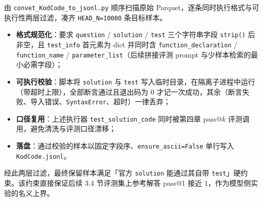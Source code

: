 
由 \texttt{convet\_KodCode\_to\_jsonl.py} 顺序扫描原始 Parquet，逐条同时执行格式与可执行性两层过滤，凑齐 \texttt{HEAD\_N=10000} 条目标样本。

\begin{itemize}
    \item \textbf{格式规范化}：要求 \texttt{question} / \texttt{solution} / \texttt{test} 三个字符串字段 \texttt{strip()} 后非空，且 \texttt{test\_info} 首元素为 dict 并同时含 \texttt{function\_declaration} / \texttt{function\_name} / \texttt{parameter\_list}（后续拼接评测 prompt 与少样本检索的最小必需字段）；
    \item \textbf{可执行校验}：脚本将 \texttt{solution} 与 \texttt{test} 写入临时目录，在隔离子进程中运行（带超时上限），全部断言通过且退出码为 $0$ 才记一次成功，其余（断言失败、导入错误、\texttt{SyntaxError}、超时）一律丢弃；
    \item \textbf{口径复用}：上述执行器 \texttt{test\_solution\_code} 同时被第四章 pass@$k$ 评测调用，避免清洗与评测口径漂移；
    \item \textbf{落盘}：通过校验的样本以固定字段序、\texttt{ensure\_ascii=False} 单行写入 \texttt{KodCode.jsonl}。
\end{itemize}

经此两层过滤，最终保留样本满足「官方 \texttt{solution} 能通过其自带 \texttt{test}」硬约束。该约束直接保证后续 3.4 节评测集上参考解答 pass@1 接近 $1$，作为模型侧实验的名义上界。

